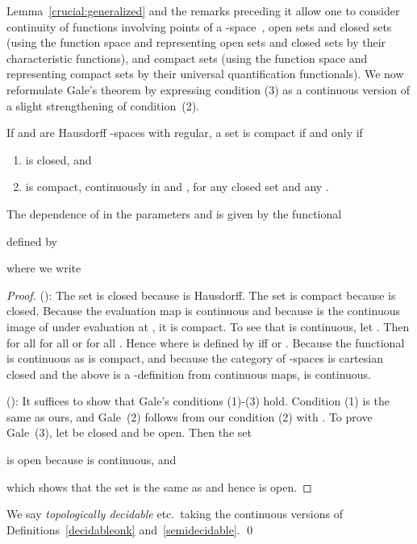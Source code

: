 \documentclass{LMCS}
\begin{document}
Lemma~\ref{crucial:generalized} and the remarks preceding it allow one
to consider continuity of functions involving points of a
-space~, open sets and closed sets (using the function space
 and representing open sets and closed sets by their
characteristic functions), and compact sets (using the function space
 and representing compact sets by their universal
quantification functionals). We now reformulate Gale's theorem by
expressing condition (3) as a continuous version of a slight
strengthening of condition~(2). 
\begin{thm} \label{gale:modified}
  If  and  are Hausdorff -spaces with  regular, a set  is compact if and only if
  \begin{enumerate}
  \item  is closed, and
  \item  is compact, continuously in  and ,
    for any closed set  and any .
  \end{enumerate}
\end{thm}
\noindent The dependence of  in the parameters  and  is
given by the functional

defined by

where we write

\begin{proof}
  (): The set  is closed because  is Hausdorff.
  The set  is compact because  is closed.  Because the
  evaluation map is continuous and because  is the
  continuous image of  under evaluation at , it is
  compact. To see that  is continuous, let .  Then
   for all    for
  all    or  for all .
  Hence 
  where  is defined by
   iff  or .  Because the
  functional  is continuous as  is compact, and because
  the category of -spaces is cartesian closed and the above is a
  -definition from continuous maps,  is
  continuous.

\medskip

 (): It suffices to show that Gale's conditions (1)-(3)
 hold.  Condition (1) is the same as ours, and Gale~(2) follows from
 our condition (2) with . To prove Gale~(3), let  be closed and  be open. Then the set 
 
 is open because  is continuous, and
 
 which shows that the set  is the
 same as  and hence is open.
\end{proof}


\begin{defi}
We say \emph{topologically decidable} etc.\ taking
  the continuous versions of Definitions~\ref{decidableonk}
  and~\ref{semidecidable}. \qed
\end{defi}
\end{document}
